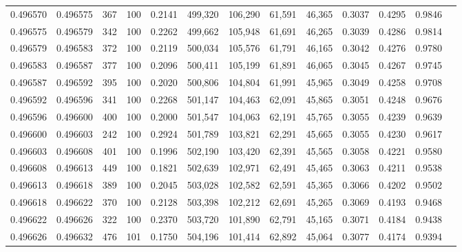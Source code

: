 \begin{tabular}{rrrrrrrrrrrrr}
0.496570 & 0.496575 &   367 & 100 &                                     0.2141 & 499,320 & 106,290 &  61,591 &  46,365 & 0.3037 & 0.4295 & 0.9846 \\
0.496575 & 0.496579 &   342 & 100 &                                     0.2262 & 499,662 & 105,948 &  61,691 &  46,265 & 0.3039 & 0.4286 & 0.9814 \\
0.496579 & 0.496583 &   372 & 100 &                                     0.2119 & 500,034 & 105,576 &  61,791 &  46,165 & 0.3042 & 0.4276 & 0.9780 \\
0.496583 & 0.496587 &   377 & 100 &                                     0.2096 & 500,411 & 105,199 &  61,891 &  46,065 & 0.3045 & 0.4267 & 0.9745 \\
0.496587 & 0.496592 &   395 & 100 &                                     0.2020 & 500,806 & 104,804 &  61,991 &  45,965 & 0.3049 & 0.4258 & 0.9708 \\
0.496592 & 0.496596 &   341 & 100 &                                     0.2268 & 501,147 & 104,463 &  62,091 &  45,865 & 0.3051 & 0.4248 & 0.9676 \\
0.496596 & 0.496600 &   400 & 100 &                                     0.2000 & 501,547 & 104,063 &  62,191 &  45,765 & 0.3055 & 0.4239 & 0.9639 \\
0.496600 & 0.496603 &   242 & 100 &                                     0.2924 & 501,789 & 103,821 &  62,291 &  45,665 & 0.3055 & 0.4230 & 0.9617 \\
0.496603 & 0.496608 &   401 & 100 &                                     0.1996 & 502,190 & 103,420 &  62,391 &  45,565 & 0.3058 & 0.4221 & 0.9580 \\
0.496608 & 0.496613 &   449 & 100 &                                     0.1821 & 502,639 & 102,971 &  62,491 &  45,465 & 0.3063 & 0.4211 & 0.9538 \\
0.496613 & 0.496618 &   389 & 100 &                                     0.2045 & 503,028 & 102,582 &  62,591 &  45,365 & 0.3066 & 0.4202 & 0.9502 \\
0.496618 & 0.496622 &   370 & 100 &                                     0.2128 & 503,398 & 102,212 &  62,691 &  45,265 & 0.3069 & 0.4193 & 0.9468 \\
0.496622 & 0.496626 &   322 & 100 &                                     0.2370 & 503,720 & 101,890 &  62,791 &  45,165 & 0.3071 & 0.4184 & 0.9438 \\
0.496626 & 0.496632 &   476 & 101 &                                     0.1750 & 504,196 & 101,414 &  62,892 &  45,064 & 0.3077 & 0.4174 & 0.9394 \\

\end{tabular}
